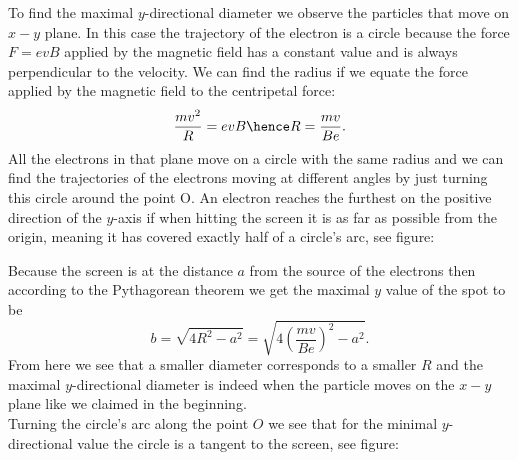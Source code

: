 \documentclass[11pt]{article}
\begin{document}
\solueng
To find the maximal $y$-directional diameter we observe the particles that move on $x-y$ plane. In this case the trajectory of the electron is a circle because the force $F=evB$ applied by the magnetic field has a constant value and is always perpendicular to the velocity. We can find the radius if we equate the force applied by the magnetic field to the centripetal force:
$$\frac{mv^2}{R}=evB \hence R = \frac{mv}{Be}.$$
All the electrons in that plane move on a circle with the same radius and we can find the trajectories of the electrons moving at different angles by just turning this circle around the point O. An electron reaches the furthest on the positive direction of the $y$-axis if when hitting the screen it is as far as possible from the origin, meaning it has covered exactly half of a circle’s arc, see figure:
\begin{center}
\end{center}
Because the screen is at the distance $a$ from the source of the electrons then according to the Pythagorean theorem we get the maximal $y$ value of the spot to be 
$$b=\sqrt{4R^2-a^2} = \sqrt{4\left(\frac{mv}{Be}\right)^2-a^2}.$$
From here we see that a smaller diameter corresponds to a smaller $R$ and the maximal $y$-directional diameter is indeed when the particle moves on the $x-y$ plane like we claimed in the beginning.\\
Turning the circle’s arc along the point $O$ we see that for the minimal $y$-directional value the circle is a tangent to the screen, see figure:
\end{document}
